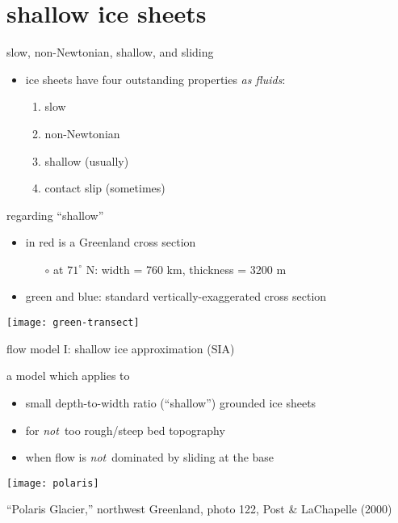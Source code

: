 
\section{shallow ice sheets}

\begin{frame}{slow, non-Newtonian, shallow, and sliding}

\begin{itemize}
\item ice sheets have four outstanding properties \emph{as fluids}:
  \begin{enumerate}
  \item slow
  \item non-Newtonian
  \item shallow (usually)
  \item contact slip (sometimes)
  \end{enumerate}
\end{itemize}
\end{frame}


\begin{frame}{regarding ``shallow''}

\begin{itemize}
\item in \alert{red} is a Greenland cross section
  \begin{itemize}
  \item[$\circ$] at $71^\circ$ N: \qquad width = 760 km, thickness = 3200 m
  \end{itemize}
\item green and blue: standard vertically-exaggerated cross section
\end{itemize}

\begin{center}
  \texttt{[image: green-transect]}
\end{center}
\end{frame}


\begin{frame}{flow model I: shallow ice approximation (SIA)}

a model which applies to
\begin{itemize}
\item small depth-to-width ratio (``shallow'') grounded ice sheets
\item for \emph{not}\, too rough/steep bed topography
\item when flow is \emph{not}\, dominated by sliding at the base
\end{itemize}

\begin{center}
  \texttt{[image: polaris]}

\tiny ``Polaris Glacier,'' northwest Greenland, photo 122, Post \& LaChapelle (2000)
\end{center}

\end{frame}


